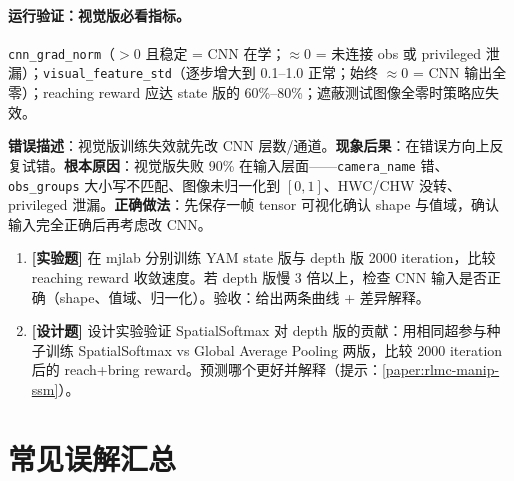 \paragraph{运行验证：视觉版必看指标。}\verb|cnn_grad_norm|（$>0$ 且稳定 = CNN 在学；$\approx0$ = 未连接 obs 或 privileged 泄漏）；\verb|visual_feature_std|（逐步增大到 0.1--1.0 正常；始终 $\approx0$ = CNN 输出全零）；reaching reward 应达 state 版的 60\%--80\%；遮蔽测试图像全零时策略应失效。

\begin{pitfall}
\textbf{错误描述}：视觉版训练失效就先改 CNN 层数/通道。\textbf{现象后果}：在错误方向上反复试错。\textbf{根本原因}：视觉版失败 90\% 在输入层面——\verb|camera_name| 错、\verb|obs_groups| 大小写不匹配、图像未归一化到 $[0,1]$、HWC/CHW 没转、privileged 泄漏。\textbf{正确做法}：先保存一帧 tensor 可视化确认 shape 与值域，确认输入完全正确后再考虑改 CNN。
\end{pitfall}

\begin{practice}[本节练习]
\begin{enumerate}
  \item \textbf{[实验题]} 在 mjlab 分别训练 YAM state 版与 depth 版 2000 iteration，比较 reaching reward 收敛速度。若 depth 版慢 3 倍以上，检查 CNN 输入是否正确（shape、值域、归一化）。验收：给出两条曲线 + 差异解释。
  \item \textbf{[设计题]} 设计实验验证 SpatialSoftmax 对 depth 版的贡献：用相同超参与种子训练 SpatialSoftmax vs Global Average Pooling 两版，比较 2000 iteration 后的 reach+bring reward。预测哪个更好并解释（提示：\cref{paper:rlmc-manip-ssm}）。
\end{enumerate}
\end{practice}

\section*{常见误解汇总}
\label{sec:rlmc-manip-misconcept}

